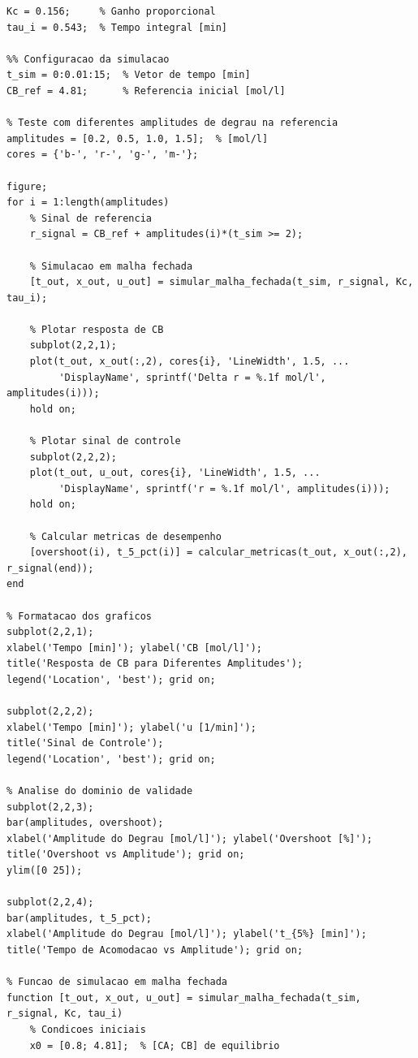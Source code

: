 \documentclass[a4paper,12pt]{article}
\begin{document}
\begin{lstlisting}[caption=Simulacao do controle PI em sistema nao linear]
%% Parametros do controlador PI projetado
Kc = 0.156;     % Ganho proporcional
tau_i = 0.543;  % Tempo integral [min]

%% Configuracao da simulacao
t_sim = 0:0.01:15;  % Vetor de tempo [min]
CB_ref = 4.81;      % Referencia inicial [mol/l]

% Teste com diferentes amplitudes de degrau na referencia
amplitudes = [0.2, 0.5, 1.0, 1.5];  % [mol/l]
cores = {'b-', 'r-', 'g-', 'm-'};

figure;
for i = 1:length(amplitudes)
    % Sinal de referencia
    r_signal = CB_ref + amplitudes(i)*(t_sim >= 2);
    
    % Simulacao em malha fechada
    [t_out, x_out, u_out] = simular_malha_fechada(t_sim, r_signal, Kc, tau_i);
    
    % Plotar resposta de CB
    subplot(2,2,1);
    plot(t_out, x_out(:,2), cores{i}, 'LineWidth', 1.5, ...
         'DisplayName', sprintf('Delta r = %.1f mol/l', amplitudes(i)));
    hold on;
    
    % Plotar sinal de controle
    subplot(2,2,2);
    plot(t_out, u_out, cores{i}, 'LineWidth', 1.5, ...
         'DisplayName', sprintf('r = %.1f mol/l', amplitudes(i)));
    hold on;
    
    % Calcular metricas de desempenho
    [overshoot(i), t_5_pct(i)] = calcular_metricas(t_out, x_out(:,2), r_signal(end));
end

% Formatacao dos graficos
subplot(2,2,1);
xlabel('Tempo [min]'); ylabel('CB [mol/l]');
title('Resposta de CB para Diferentes Amplitudes');
legend('Location', 'best'); grid on;

subplot(2,2,2);
xlabel('Tempo [min]'); ylabel('u [1/min]');
title('Sinal de Controle'); 
legend('Location', 'best'); grid on;

% Analise do dominio de validade
subplot(2,2,3);
bar(amplitudes, overshoot);
xlabel('Amplitude do Degrau [mol/l]'); ylabel('Overshoot [%]');
title('Overshoot vs Amplitude'); grid on;
ylim([0 25]);

subplot(2,2,4);
bar(amplitudes, t_5_pct);
xlabel('Amplitude do Degrau [mol/l]'); ylabel('t_{5%} [min]');
title('Tempo de Acomodacao vs Amplitude'); grid on;

% Funcao de simulacao em malha fechada
function [t_out, x_out, u_out] = simular_malha_fechada(t_sim, r_signal, Kc, tau_i)
    % Condicoes iniciais
    x0 = [0.8; 4.81];  % [CA; CB] de equilibrio
    

\end{lstlisting}
\end{document}
